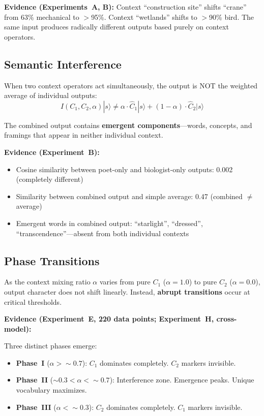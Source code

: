 \documentclass[11pt,a4paper]{article}
\newcommand{\ket}[1]{|#1\rangle}
\newcommand{\chat}{\hat{C}}
\begin{document}
\textbf{Evidence (Experiments~A, B):} Context ``construction site'' shifts ``crane'' from 63\% mechanical to $>$95\%. Context ``wetlands'' shifts to $>$90\% bird. The same input produces radically different outputs based purely on context operators.

\subsection{Semantic Interference}

When two context operators act simultaneously, the output is NOT the weighted average of individual outputs:
\begin{equation}
I(C_1, C_2, \alpha)\ket{s} \neq \alpha \cdot \chat_1\ket{s} + (1-\alpha) \cdot \chat_2\ket{s}
\end{equation}

The combined output contains \textbf{emergent components}---words, concepts, and framings that appear in neither individual context.

\textbf{Evidence (Experiment~B):}
\begin{itemize}
\item Cosine similarity between poet-only and biologist-only outputs: 0.002 (completely different)
\item Similarity between combined output and simple average: 0.47 (combined $\neq$ average)
\item Emergent words in combined output: ``starlight'', ``dressed'', ``transcendence''---absent from both individual contexts
\end{itemize}

\subsection{Phase Transitions}

As the context mixing ratio $\alpha$ varies from pure $C_1$ ($\alpha=1.0$) to pure $C_2$ ($\alpha=0.0$), output character does not shift linearly. Instead, \textbf{abrupt transitions} occur at critical thresholds.

\textbf{Evidence (Experiment~E, 220 data points; Experiment~H, cross-model):}

Three distinct phases emerge:
\begin{itemize}
\item \textbf{Phase~I} ($\alpha > \sim 0.7$): $C_1$ dominates completely. $C_2$ markers invisible.
\item \textbf{Phase~II} ($\sim 0.3 < \alpha < \sim 0.7$): Interference zone. Emergence peaks. Unique vocabulary maximizes.
\item \textbf{Phase~III} ($\alpha < \sim 0.3$): $C_2$ dominates completely. $C_1$ markers invisible.
\end{itemize}
\end{document}
